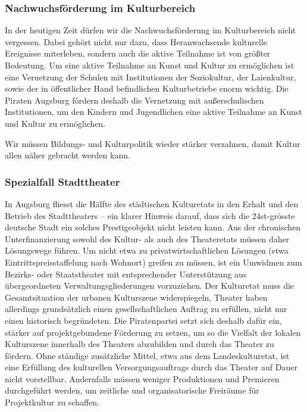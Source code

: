 \documentclass[a5paper, twoside, ngerman, 10pt]{scrbook}
\begin{document}
   \subsubsection{Nachwuchsförderung im Kulturbereich}
   
   In der heutigen Zeit dürfen wir die Nachwuchsförderung im Kulturbereich 
   nicht vergessen. Dabei gehört nicht nur dazu, dass Heranwachsende 
   kulturelle Ereignisse miterleben, sondern auch die aktive Teilnahme ist von 
   größter Bedeutung. Um eine aktive Teilnahme an Kunst und Kultur zu 
   ermöglichen ist eine Vernetzung der Schulen mit Institutionen der 
   Soziokultur, der Laienkultur, sowie der in öffentlicher Hand befindlichen 
   Kulturbetriebe enorm wichtig. Die Piraten Augsburg fördern deshalb die 
   Vernetzung mit außerschulischen Institutionen, um den Kindern und 
   Jugendlichen eine aktive Teilnahme an Kunst und Kultur zu ermöglichen.
   
   Wir müssen Bildungs- und Kulturpolitik wieder stärker verzahnen, damit 
   Kultur allen näher gebracht werden kann.
   
   \subsubsection{Spezialfall Stadttheater}
   
   In Augsburg fliesst die Hälfte des städtischen Kulturetats in den Erhalt 
   und den Betrieb des Stadttheaters – ein klarer Hinweis darauf, dass sich 
   die 24st-grösste deutsche Stadt ein solches Prestigeobjekt nicht leisten 
   kann. Aus der chronischen Unterfinanzierung sowohl des Kultur- als auch des 
   Theateretats müssen daher Lösungswege führen. Um nicht etwa zu 
   privatwirtschaftlichen Lösungen (etwa Eintrittspreisstaffelung nach 
   Wohnort) greifen zu müssen, ist ein Umwidmen zum Bezirks- oder 
   Staatstheater mit entsprechender Unterstützung aus übergeordneten 
   Verwaltungsgliederungen vorzuziehen. Der Kulturetat muss die 
   Gesamtsituation der urbanen Kulturszene widerspiegeln, Theater haben 
   allerdings grundsätzlich einen gesellschaftlichen Auftrag zu erfüllen, 
   nicht nur einen historisch begründeten. Die Piratenpartei setzt sich 
   deshalb dafür ein, stärker auf projektgebundene Förderung zu setzen, um so 
   die Vielfalt der lokalen Kulturszene innerhalb des Theaters abzubilden und 
   durch das Theater zu fördern. Ohne ständige zusätzliche Mittel, etwa aus 
   dem Landeskulturetat, ist eine Erfüllung des kulturellen 
   Versorgungsauftrags durch das Theater auf Dauer nicht vorstellbar. 
   Andernfalls müssen weniger Produktionen und Premieren durchgeführt werden, 
   um zeitliche und organisatorische Freiräume für Projektkultur zu schaffen.
   
\end{document}
